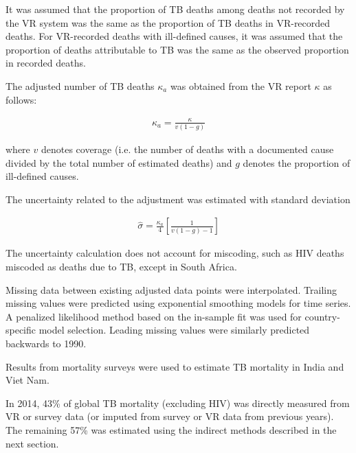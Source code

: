 It was assumed that the proportion of TB deaths among deaths not recorded by the VR system was the same as the proportion of TB deaths in VR-recorded deaths. For VR-recorded deaths with ill-defined causes, it was assumed that the proportion of deaths attributable to TB was the same as the observed proportion in recorded deaths. 

The adjusted number of TB deaths $\kappa_a$ was obtained from the VR report $\kappa$ as follows:

\begin{align*}
\kappa_a = \frac{\kappa}{v(1-g)}
\end{align*}

where $v$ denotes coverage (i.e. the number of deaths with a documented cause divided by the total number of estimated deaths) and $g$ denotes the proportion of ill-defined causes.

The uncertainty related to the adjustment was estimated with standard deviation 

\begin{align*}
\hat{\sigma} = \frac{\kappa_a}{4} \left[\frac{1}{v(1-g) -1}\right]
\end{align*}

The uncertainty calculation does not account for miscoding, such as HIV deaths miscoded as deaths due to TB, except in South Africa. 

Missing data between existing adjusted data points were interpolated. Trailing missing values were predicted using exponential smoothing models for time series\cite{Hyndman2008-ax}. A penalized likelihood method based on the in-sample fit was used for country-specific model selection. Leading missing values were similarly predicted backwards to 1990. 

Results from mortality surveys were used to estimate TB mortality in India and Viet Nam. 

In 2014, 43\% of global TB mortality (excluding HIV) was directly measured from VR or survey data (or imputed from survey or VR data from previous years). The remaining 57\% was estimated using the indirect methods described in the next section.




